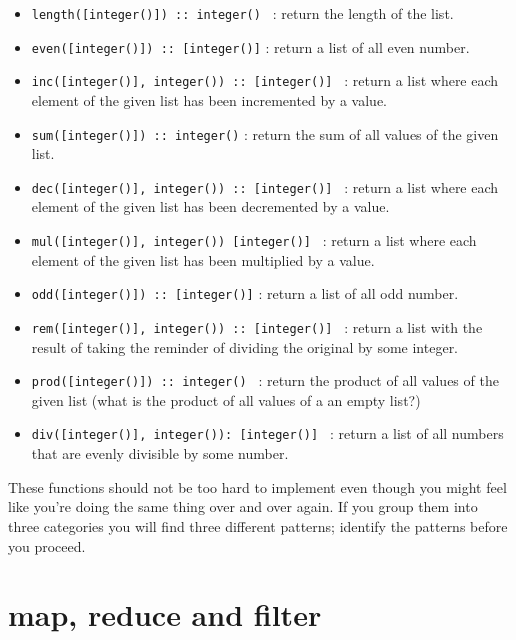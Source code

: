 \documentclass[a4paper,11pt]{article}
\begin{document}
\begin{itemize}
  \item {\tt length([integer()]) :: integer() } : return the length of the list. 

  \item {\tt even([integer()]) :: [integer()]} : return a list of all even number.

  \item {\tt inc([integer()], integer()) :: [integer()] } : return a list where each
    element of the given list has been incremented by a value.

  \item {\tt sum([integer()]) :: integer()} : return the sum of all values of the given list.

  \item {\tt dec([integer()], integer()) :: [integer()] } : return a list where each
    element of the given list has been decremented by a value.

  \item {\tt mul([integer()], integer()) [integer()] } : return a list where each
    element of the given list has been multiplied by a value.

  \item {\tt odd([integer()]) :: [integer()]} : return a list of all odd number.

  \item {\tt rem([integer()], integer()) :: [integer()] } : return a list with the
    result of taking the reminder of dividing the original by some integer.

  \item {\tt prod([integer()]) :: integer() } : return the product of
    all values of the given list (what is the product of all values of
    a an empty list?)

  \item {\tt div([integer()], integer()): [integer()] } : return a list of all
    numbers that are evenly divisible by some number.
    
  \end{itemize}
  
  These functions should not be too hard to implement even though you
  might feel like you're doing the same thing over and over again. If
  you group them into three categories you will find three different
  patterns; identify the patterns before you proceed. 

  \section*{map, reduce and filter}
\end{document}

